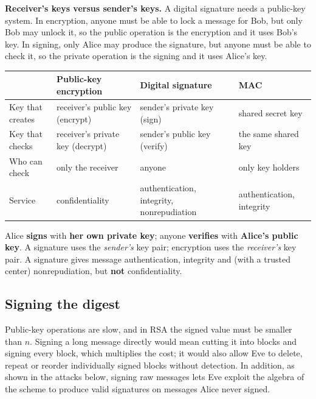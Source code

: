 \textbf{Receiver's keys versus sender's keys.} A digital signature needs a public-key system.  In encryption, anyone must be able to lock a message for Bob, but only Bob may unlock it, so the public operation is the encryption and it uses Bob's key. In signing, only Alice may produce the signature, but anyone must be able to check it, so the private operation is the signing and it uses Alice's key.

\begin{center}\small
\begin{tabularx}{\textwidth}{@{}l X X X@{}}
\toprule
 & Public-key encryption & Digital signature & MAC\\
\midrule
Key that creates & receiver's public key (encrypt) & sender's private key (sign) & shared secret key\\
Key that checks & receiver's private key (decrypt) & sender's public key (verify) & the same shared key\\
Who can check & only the receiver & anyone & only key holders\\
Service & confidentiality & authentication, integrity, nonrepudiation & authentication, integrity\\
\bottomrule
\end{tabularx}
\end{center}

\begin{mustknow}
Alice \textbf{signs} with \textbf{her own private key}; anyone \textbf{verifies} with \textbf{Alice's public key}. A signature uses the \emph{sender's} key pair; encryption uses the \emph{receiver's} key pair. A signature gives message authentication, integrity and (with a trusted center) nonrepudiation, but \textbf{not} confidentiality.
\end{mustknow}

\subsection{Signing the digest \new}

Public-key operations are slow, and in RSA the signed value must be smaller than $n$. Signing a long message directly would mean cutting it into blocks and signing every block, which multiplies the cost; it would also allow Eve to delete, repeat or reorder individually signed blocks without detection. In addition, as shown in the attacks below, signing raw messages lets Eve exploit the algebra of the scheme to produce valid signatures on messages Alice never signed.

